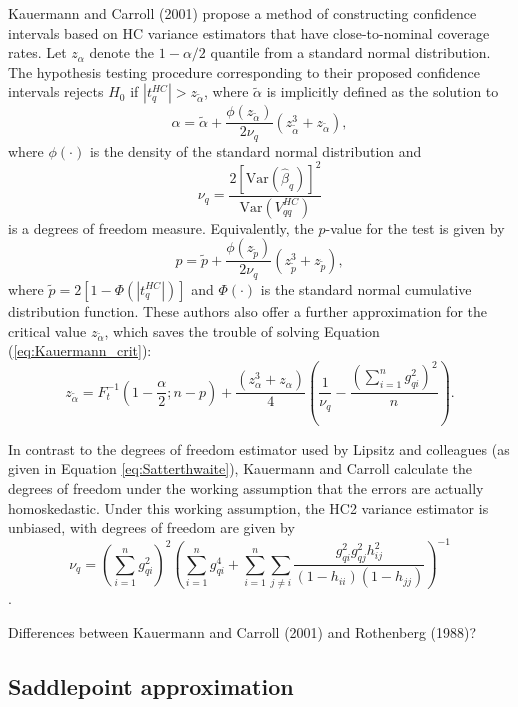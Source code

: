 \documentclass{article}\usepackage[]{graphicx}\usepackage[]{color}
\newcommand{\Var}{\text{Var}}
\begin{document}
Kauermann and Carroll (2001) propose a method of constructing confidence intervals based on HC variance estimators that have close-to-nominal coverage rates. Let $z_{\alpha}$ denote the $1 - \alpha / 2$ quantile from a standard normal distribution. The hypothesis testing procedure corresponding to their proposed confidence intervals rejects $H_0$ if $\left|t^{HC}_q\right| > z_{\tilde\alpha}$, where $\tilde\alpha$ is implicitly defined as the solution to \begin{equation}
\label{eq:Kauermann_crit}
\alpha = \tilde\alpha + \frac{\phi\left(z_{\tilde\alpha}\right)}{2 \nu_q}\left(z_{\tilde\alpha}^3 + z_{\tilde\alpha}\right), 
\end{equation}
where $\phi(\cdot)$ is the density of the standard normal distribution and \[
\nu_q  = \frac{2 \left[\Var(\hat\beta_q)\right]^2}{\Var\left(V^{HC}_{qq}\right)}\] 
is a degrees of freedom measure. Equivalently, the $p$-value for the test is given by \[
p = \tilde{p} + \frac{\phi\left(z_{\tilde{p}}\right)}{2 \nu_q}\left(z_{\tilde{p}}^3 + z_{\tilde{p}}\right), \]
where $\tilde{p} = 2 \left[1 - \Phi\left(|t^{HC}_q|\right)\right]$ and $\Phi(\cdot)$ is the standard normal cumulative distribution function. These authors also offer a further approximation for the critical value $z_{\tilde\alpha}$, which saves the trouble of solving Equation (\ref{eq:Kauermann_crit}):
\[
z_{\tilde\alpha} = F_t^{-1}\left(1 - \frac{\alpha}{2}; n - p\right) + \frac{\left(z_\alpha^3 + z_\alpha\right)}{4}\left(\frac{1}{\nu_q} - \frac{\left(\sum_{i=1}^n g_{qi}^2\right)^2}{n}\right). \]

In contrast to the degrees of freedom estimator used by Lipsitz and colleagues (as given in Equation \ref{eq:Satterthwaite}), Kauermann and Carroll calculate the degrees of freedom under the working assumption that the errors are actually homoskedastic. Under this working assumption, the HC2 variance estimator is unbiased, with degrees of freedom are given by \[
\nu_q = \left(\sum_{i=1}^n g_{qi}^2\right)^2\left(\sum_{i=1}^n g_{qi}^4 + \sum_{i=1}^n \sum_{j \neq i} \frac{g_{qi}^2 g_{qj}^2 h_{ij}^2}{(1 - h_{ii})(1 - h_{jj})}\right)^{-1} \].

Differences between Kauermann and Carroll (2001) and Rothenberg (1988)?

\subsection{Saddlepoint approximation}
\end{document}
